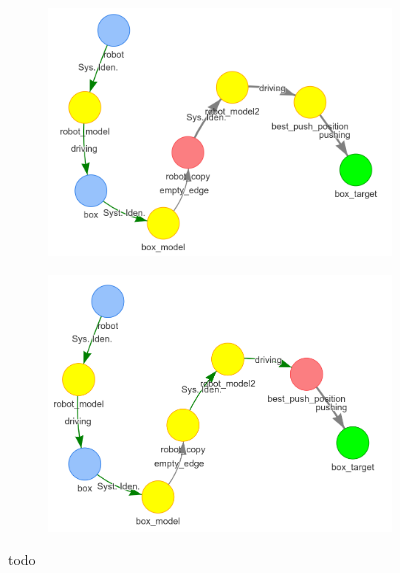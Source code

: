 \begin{figure}[H]
    \begin{subfigure}{.3\textwidth}
    \centering
    \includegraphics[width=1\textwidth]{figures/proposed_method/connecting_nodes/robot_push/robot_push_7}
    \caption{}\label{subfig:robot_push_8}
    \end{subfigure}
    \begin{subfigure}{.3\textwidth}
    \centering
    \includegraphics[width=1.05\textwidth]{figures/proposed_method/connecting_nodes/robot_push/robot_push_8}
    \caption{}\label{subfig:robot_push_9}
    \end{subfigure}
    \caption{todo}%
    \label{fig:robot_push_3}
\end{figure}





